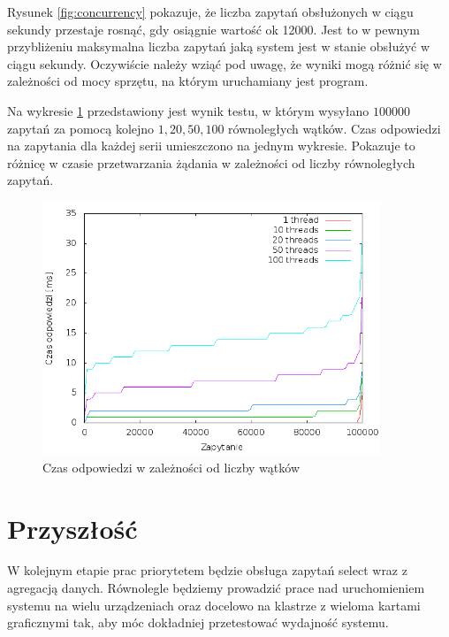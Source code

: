\documentclass[paper=a4, fontsize=11pt]{scrartcl} %
\numberwithin{equation}{section} %
\numberwithin{figure}{section} %
\numberwithin{table}{section} %
\begin{document}
Rysunek \ref{fig:concurrency} pokazuje, że liczba zapytań obsłużonych w ciągu sekundy przestaje rosnąć, gdy osiągnie wartość ok 12000. Jest to w pewnym przybliżeniu maksymalna liczba zapytań jaką system jest w stanie obsłużyć w ciągu sekundy. Oczywiście należy wziąć pod uwagę, że wyniki mogą różnić się w zależności od mocy sprzętu, na którym uruchamiany jest program. 

\linebreak\linebreak

Na wykresie \ref{fig:threads} przedstawiony jest wynik testu, w którym wysyłano $100000$ zapytań za pomocą kolejno $1, 20, 50, 100$ równoległych wątków. Czas odpowiedzi na zapytania dla każdej serii umieszczono na jednym wykresie. Pokazuje to różnicę w czasie przetwarzania żądania w zależności od liczby równoległych zapytań.

		\begin{figure}[ht!]
	\centering
	\caption{Czas odpowiedzi w zależności od liczby wątków}
		\label{fig:threads}
		\includegraphics[width=0.9\textwidth]{img/threadsTest.png}
	\end{figure}
	
 

\section{Przyszłość}
W kolejnym etapie prac priorytetem będzie obsługa zapytań select wraz z agregacją danych. Równolegle będziemy prowadzić prace nad uruchomieniem systemu na wielu urządzeniach oraz docelowo na klastrze z wieloma kartami graficznymi tak, aby móc dokładniej przetestować wydajność systemu.
\end{document}

